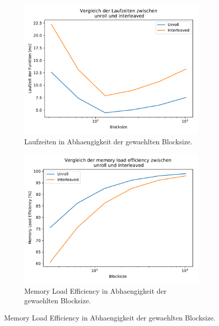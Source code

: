 \documentclass[10pt,a4paper]{article}
\begin{document}
\begin{figure}[H]
  \begin{subfigure}{.5\textwidth}
    \centering
    \includegraphics[width=\textwidth]{../figures/laufzeiten_blocksize.pdf}
    \caption{Laufzeiten in Abhaengigkeit der gewaehlten Blocksize.}
  \end{subfigure}
  \begin{subfigure}{.5\textwidth}
    \centering
    \includegraphics[width=\textwidth]{../figures/mem_ld_eff_blocksize.pdf}
    \caption{Memory Load Efficiency in Abhaengigkeit der gewaehlten Blocksize.}
  \end{subfigure}


\end{figure}
\end{document}
